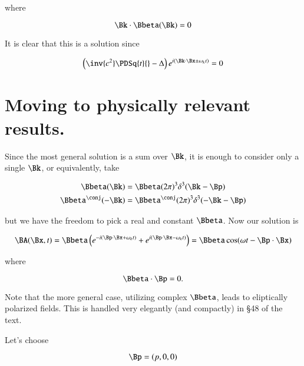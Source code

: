 where

\begin{equation}\label{eqn:relativisticElectrodynamicsL16:70}
\Bk \cdot \Bbeta(\Bk) = 0
\end{equation}

It is clear that this is a solution since

\begin{equation}\label{eqn:relativisticElectrodynamicsL16:90}
\left( \inv{c^2} \PDSq{t}{} - \Delta \right) e^{i (\Bk \cdot \Bx \pm \omega_k t)} = 0
\end{equation}

\section{Moving to physically relevant results.}

Since the most general solution is a sum over $\Bk$, it is enough to consider only a single $\Bk$, or equivalently, take

\begin{align}\label{eqn:relativisticElectrodynamicsL16:110}
\Bbeta(\Bk) &= \Bbeta ( 2\pi)^3 \delta^3(\Bk - \Bp) \\
\Bbeta^\conj(-\Bk) &= \Bbeta^\conj ( 2\pi)^3 \delta^3(-\Bk - \Bp)
\end{align}

but we have the freedom to pick a real and constant $\Bbeta$.  Now our solution is

\begin{equation}\label{eqn:relativisticElectrodynamicsL16:130}
\BA(\Bx, t) = \Bbeta \left(
e^{-i (\Bp \cdot \Bx + \omega_k t)}
+e^{i (\Bp \cdot \Bx - \omega_k t)}
\right)
= \Bbeta \cos( \omega t - \Bp \cdot \Bx)
\end{equation}

where

\begin{equation}\label{eqn:relativisticElectrodynamicsL16:150}
\Bbeta \cdot \Bp = 0.
\end{equation}

Note that the more general case, utilizing complex $\Bbeta$, leads to eliptically polarized fields.  This is handled very elegantly (and compactly) in \S 48 of the text.

Let's choose

\begin{equation}\label{eqn:relativisticElectrodynamicsL16:170}
\Bp = (p, 0, 0)
\end{equation}

